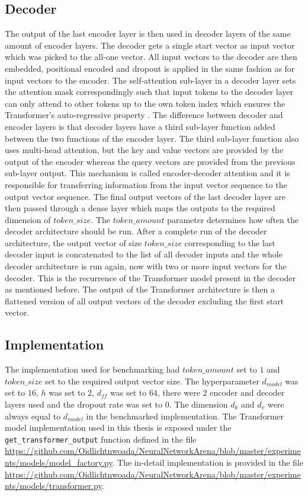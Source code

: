 \documentclass[draft,final]{vutinfth} %
\begin{document}
    \subsection{Decoder} \label{decoder}
    The output of the last encoder layer is then used in decoder layers of the same amount of encoder layers.
    The decoder gets a single start vector as input vector which was picked to the all-one vector.
    All input vectors to the decoder are then embedded, positional encoded and dropout is applied in the same fashion as for input vectors to the encoder.
    The self-attention sub-layer in a decoder layer sets the attention mask correspondingly such that input tokens to the decoder layer can only attend to other tokens up to the own token index which ensures the Transformer's auto-regressive property \cite[p. 5]{Transformer}.  
    The difference between decoder and encoder layers is that decoder layers have a third sub-layer function added between the two functions of the encoder layer.
    The third sub-layer function also uses multi-head attention, but the key and value vectors are provided by the output of the encoder whereas the query vectors are provided from the previous sub-layer output.
    This mechanism is called encoder-decoder attention and it is responsible for transferring information from the input vector sequence to the output vector sequence.
    The final output vectors of the last decoder layer are then passed through a dense layer which maps the outputs to the required dimension of $token\_size$.
    The $token\_amount$ parameter determines how often the decoder architecture should be run.
    After a complete run of the decoder architecture, the output vector of size $token\_size$ corresponding to the last decoder input is concatenated to the list of all decoder inputs and the whole decoder architecture is run again, now with two or more input vectors for the decoder.
    This is the recurrence of the Transformer model present in the decoder as mentioned before.
    The output of the Transformer architecture is then a flattened version of all output vectors of the decoder excluding the first start vector.
    \subsection{Implementation}
    The implementation used for benchmarking had $token\_amount$ set to $1$ and $token\_size$ set to the required output vector size.
    The hyperparameter $d_{model}$ was set to $16$, $h$ was set to $2$, $d_{ff}$ was set to $64$, there were $2$ encoder and decoder layers used and the dropout rate was set to $0$.
    The dimension $d_k$ and $d_v$ were always equal to $d_{model}$ in the benchmarked implementation.
    The Transformer model implementation used in this thesis is exposed under the \texttt{get\_transformer\_output} function defined in the file \url{https://github.com/Oidlichtnwoada/NeuralNetworkArena/blob/master/experiments/models/model_factory.py}.
    The in-detail implementation is provided in the file \url{https://github.com/Oidlichtnwoada/NeuralNetworkArena/blob/master/experiments/models/transformer.py}.
\end{document}
